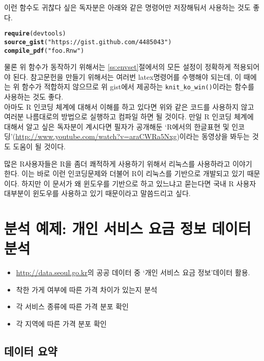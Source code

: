 \documentclass[11pt]{article}\usepackage{graphicx, color}
\makeatletter
\newcommand{\hlfunctioncall}[1]{\textcolor[rgb]{0.501960784313725,0,0.329411764705882}{\textbf{#1}}}%
\newcommand{\hlstring}[1]{\textcolor[rgb]{0.6,0.6,1}{#1}}%
\newenvironment{kframe}{%
 \def\at@end@of@kframe{}%
 \ifinner\ifhmode%
  \def\at@end@of@kframe{\end{minipage}}%
  \begin{minipage}{\columnwidth}%
 \fi\fi%
 \def\FrameCommand##1{\hskip\@totalleftmargin \hskip-\fboxsep
 \colorbox{shadecolor}{##1}\hskip-\fboxsep
     \hskip-\linewidth \hskip-\@totalleftmargin \hskip\columnwidth}%
 \MakeFramed {\advance\hsize-\width
   \@totalleftmargin\z@ \linewidth\hsize
   \@setminipage}}%
 {\par\unskip\endMakeFramed%
 \at@end@of@kframe}
\newenvironment{knitrout}{}{} %
\makeatother
\begin{document}
이런 함수도 귀찮다 싶은 독자분은 아래와 같은 명령어만 저장해둬서 사용하는 것도 좋다.

\begin{knitrout}
\color{fgcolor}\begin{kframe}
\begin{alltt}
\hlfunctioncall{require}(devtools)
\hlfunctioncall{source_gist}(\hlstring{"https://gist.github.com/4485043"})
\hlfunctioncall{compile_pdf}(\hlstring{"foo.Rnw"})
\end{alltt}
\end{kframe}
\end{knitrout}


물론 위 함수가 동작하기 위해서는 \ref{ss:envset}절에서의 모든 설정이 정확하게 적용되어야 된다. 참고문헌을 만들기 위해서는 여러번 latex명령어를 수행해야 되는데, 이 때에는 위 함수가 적합하지 않으므로 위 gist에서 제공하는 \verb|knit_ko_win()|이라는 함수를 사용하는 것도 좋다. 
\\
아마도 R 인코딩 체계에 대해서 이해를 하고 있다면 위와 같은 코드를 사용하지 않고 여러분 나름대로의 방법으로 실행하고 컴파일 하면 될 것이다. 만일 R 인코딩 체계에 대해서 알고 싶은 독자분이 계시다면 필자가 공개해둔 `R에서의 한글표현 및 인코딩'(\url{http://www.youtube.com/watch?v=araCWRa5Nxg})이라는 동영상을 봐두는 것도 도움이 될 것이다. 

많은 R사용자들은 R을 좀더 쾌적하게 사용하기 위해서 리눅스를 사용하라고 이야기 한다. 이는 바로 이런 인코딩문제와 더불어 R이 리눅스를 기반으로 개발되고 있기 때문이다. 하지만 이 문서가 왜 윈도우를 기반으로 하고 있느냐고 묻는다면 국내 R 사용자 대부분이 윈도우를 사용하고 있기 때문이라고 말씀드리고 싶다. 


\section{분석 예제: 개인 서비스 요금 정보 데이터 분석 }

\begin{itemize}
  \item \url{http://data.seoul.go.kr}의 공공 데이터 중 `개인 서비스 요금 정보'데이터 활용.
  \item 착한 가게 여부에 따른 가격 차이가 있는지 분석
  \item 각 서비스 종류에 따른 가격 분포 확인 
  \item 각 지역에 따른 가격 분포 확인 
\end{itemize}

\subsection{데이터 요약} 
\end{document}
